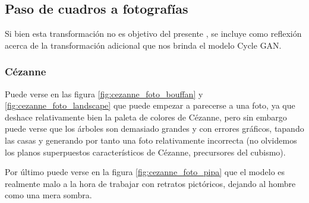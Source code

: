 \documentclass[[../main.tex]{subfiles}
\begin{document}
        \newpage

\subsection{Paso de cuadros a fotografías}

Si bien esta transformación no es objetivo del presente \tfg, se incluye como reflexión acerca de la transformación adicional que nos brinda el modelo Cycle GAN.

\subsubsection{Cézanne}

Puede verse en las figura \ref{fig:cezanne_foto_bouffan} y \ref{fig:cezanne_foto_landscape} que puede empezar a parecerse a una foto, ya que deshace relativamente bien la paleta de colores de Cézanne, pero sin embargo puede verse que los árboles son demasiado grandes y con errores gráficos, tapando las casas y generando por tanto una foto relativamente incorrecta (no olvidemos los planos superpuestos característicos de Cézanne, precursores del cubismo). \newline

Por último puede verse en la figura \ref{fig:cezanne_foto_pipa} que el modelo es realmente malo a la hora de trabajar con retratos pictóricos, dejando al hombre como una mera sombra.
\end{document}
